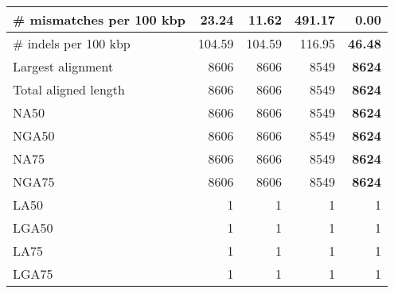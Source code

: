 \documentclass[12pt,a4paper]{article}
\begin{document}
\begin{table}[ht]
\begin{center}
\begin{tabular}{|l*{4}{|r}|}
\# mismatches per 100 kbp & 23.24 & 11.62 & 491.17 & {\bf 0.00} \\ \hline
\# indels per 100 kbp & 104.59 & 104.59 & 116.95 & {\bf 46.48} \\ \hline
Largest alignment & 8606 & 8606 & 8549 & {\bf 8624} \\ \hline
Total aligned length & 8606 & 8606 & 8549 & {\bf 8624} \\ \hline
NA50 & 8606 & 8606 & 8549 & {\bf 8624} \\ \hline
NGA50 & 8606 & 8606 & 8549 & {\bf 8624} \\ \hline
NA75 & 8606 & 8606 & 8549 & {\bf 8624} \\ \hline
NGA75 & 8606 & 8606 & 8549 & {\bf 8624} \\ \hline
LA50 & 1 & 1 & 1 & 1 \\ \hline
LGA50 & 1 & 1 & 1 & 1 \\ \hline
LA75 & 1 & 1 & 1 & 1 \\ \hline
LGA75 & 1 & 1 & 1 & 1 \\ \hline
\end{tabular}
\end{center}
\end{table}
\end{document}
